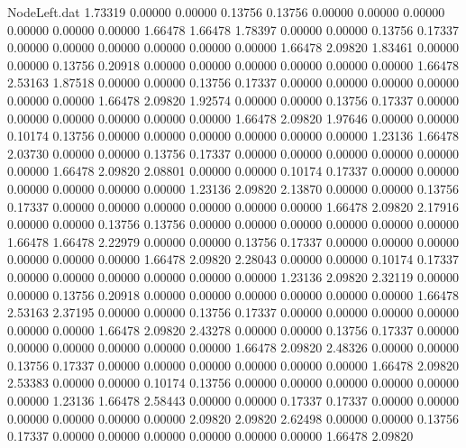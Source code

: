 \begin{filecontents}{NodeLeft.dat}
   1.73319    0.00000    0.00000     0.13756    0.13756    0.00000    0.00000    0.00000    0.00000    0.00000    0.00000    1.66478    1.66478
   1.78397    0.00000    0.00000     0.13756    0.17337    0.00000    0.00000    0.00000    0.00000    0.00000    0.00000    1.66478    2.09820
   1.83461    0.00000    0.00000     0.13756    0.20918    0.00000    0.00000    0.00000    0.00000    0.00000    0.00000    1.66478    2.53163
   1.87518    0.00000    0.00000     0.13756    0.17337    0.00000    0.00000    0.00000    0.00000    0.00000    0.00000    1.66478    2.09820
   1.92574    0.00000    0.00000     0.13756    0.17337    0.00000    0.00000    0.00000    0.00000    0.00000    0.00000    1.66478    2.09820
   1.97646    0.00000    0.00000     0.10174    0.13756    0.00000    0.00000    0.00000    0.00000    0.00000    0.00000    1.23136    1.66478
   2.03730    0.00000    0.00000     0.13756    0.17337    0.00000    0.00000    0.00000    0.00000    0.00000    0.00000    1.66478    2.09820
   2.08801    0.00000    0.00000     0.10174    0.17337    0.00000    0.00000    0.00000    0.00000    0.00000    0.00000    1.23136    2.09820
   2.13870    0.00000    0.00000     0.13756    0.17337    0.00000    0.00000    0.00000    0.00000    0.00000    0.00000    1.66478    2.09820
   2.17916    0.00000    0.00000     0.13756    0.13756    0.00000    0.00000    0.00000    0.00000    0.00000    0.00000    1.66478    1.66478
   2.22979    0.00000    0.00000     0.13756    0.17337    0.00000    0.00000    0.00000    0.00000    0.00000    0.00000    1.66478    2.09820
   2.28043    0.00000    0.00000     0.10174    0.17337    0.00000    0.00000    0.00000    0.00000    0.00000    0.00000    1.23136    2.09820
   2.32119    0.00000    0.00000     0.13756    0.20918    0.00000    0.00000    0.00000    0.00000    0.00000    0.00000    1.66478    2.53163
   2.37195    0.00000    0.00000     0.13756    0.17337    0.00000    0.00000    0.00000    0.00000    0.00000    0.00000    1.66478    2.09820
   2.43278    0.00000    0.00000     0.13756    0.17337    0.00000    0.00000    0.00000    0.00000    0.00000    0.00000    1.66478    2.09820
   2.48326    0.00000    0.00000     0.13756    0.17337    0.00000    0.00000    0.00000    0.00000    0.00000    0.00000    1.66478    2.09820
   2.53383    0.00000    0.00000     0.10174    0.13756    0.00000    0.00000    0.00000    0.00000    0.00000    0.00000    1.23136    1.66478
   2.58443    0.00000    0.00000     0.17337    0.17337    0.00000    0.00000    0.00000    0.00000    0.00000    0.00000    2.09820    2.09820
   2.62498    0.00000    0.00000     0.13756    0.17337    0.00000    0.00000    0.00000    0.00000    0.00000    0.00000    1.66478    2.09820

\end{filecontents}
